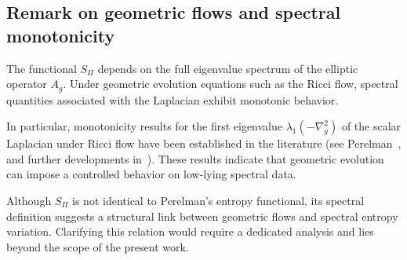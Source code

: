 \subsection{Remark on geometric flows and spectral monotonicity}
  \label{subsec:ricci-flow}

  The functional $S_\Pi$ depends on the full eigenvalue spectrum of the
  elliptic operator $A_g$.
  Under geometric evolution equations such as the Ricci flow,
  spectral quantities associated with the Laplacian exhibit
  monotonic behavior.

  In particular, monotonicity results for the first eigenvalue
  $\lambda_1(-\nabla_g^2)$ of the scalar Laplacian under Ricci flow
  have been established in the literature
  (see Perelman~\cite{Perelman2002}, and further developments
  in~\cite{Cao2007,Ma2006}).
  These results indicate that geometric evolution can impose
  a controlled behavior on low-lying spectral data.

  Although $S_\Pi$ is not identical to Perelman's entropy functional,
  its spectral definition suggests a structural link between
  geometric flows and spectral entropy variation.
  Clarifying this relation would require a dedicated analysis
  and lies beyond the scope of the present work.
